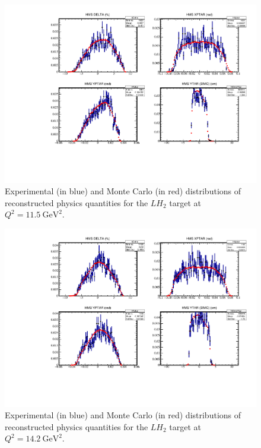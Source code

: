 \begin{figure}[!h]
    \centering
    \includegraphics[page=3,width=1.0\textwidth]{pass5_report/Report_h115.pdf}
    \caption{
            Experimental (in blue) and Monte Carlo (in red) distributions of
            reconstructed physics quantities for
            the $LH_2$ target at $Q^2=\SI{11.5}{\giga\electronvolt\squared}$.
            }
    \label{fig:Report_h115.pdf}
\end{figure}


\begin{figure}[!h]
    \centering
    \includegraphics[page=3,width=1.0\textwidth]{pass5_report/Report_h143.pdf}
    \caption{
            Experimental (in blue) and Monte Carlo (in red) distributions of
            reconstructed physics quantities for
            the $LH_2$ target at $Q^2=\SI{14.2}{\giga\electronvolt\squared}$.
            }
    \label{fig:Report_h143.pdf}
\end{figure}


